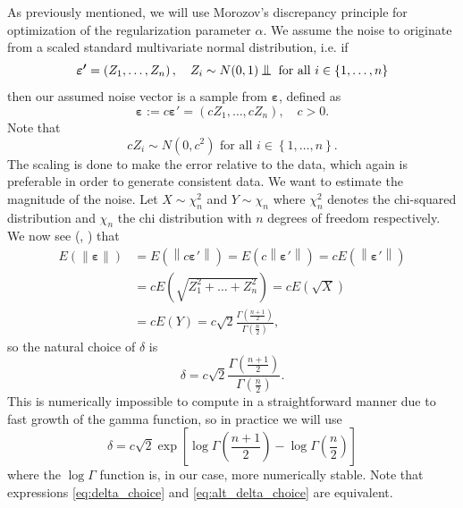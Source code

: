 \documentclass[12pt,a4]{article}
\newcommand{\lnorm}{\left\|}
\newcommand{\rnorm}{\right\|}
\newcommand{\eps}{\ensuremath{\varepsilon}}
\newcommand{\vc}[1]{\ensuremath{\bm{#1}}}
\newcommand*{\bigCI}{%
  \mathrel{\text{%
    {\rotatebox[origin=c]{90}{\resizebox{2.25ex}{1.65ex}{$\vDash$}}}%
  }}%
}
\begin{document}
As previously mentioned, we will use Morozov's discrepancy principle for optimization of the regularization parameter $\alpha$. We assume the noise to originate from a scaled standard multivariate normal distribution, i.e. if
\begin{equation}
\vc{\eps'} = \left(Z_1, \ldots, Z_n \right), \quad Z_i \sim N(0,1) \bigCI \text{ for all }
i \in \left\{1, \ldots, n\right\}
\end{equation}
then our assumed noise vector is a sample from $\vc{\eps}$, defined as
\begin{equation}
\vc{\eps} := c \vc{\eps'} = \left(cZ_1, \ldots, cZ_n \right), \quad c > 0.
\end{equation}
Note that
\begin{equation}
cZ_i \sim N\left(0,c^2\right) \text{ for all }
i \in \left\{1, \ldots, n\right\}.
\end{equation}
The scaling is done to make the error relative to the data, which again is preferable in order to generate consistent data. We want to estimate the magnitude of the noise. Let $X \sim \chi_n^2$ and $Y \sim \chi_n$ where $\chi_n^2$ denotes the chi-squared distribution and $\chi_n$ the chi distribution with $n$ degrees of freedom respectively. We now see (\cite{handbook}, \cite{chi}) that
\begin{align*}
E\left(\lnorm \vc{\eps} \rnorm \right)   &= E\left(\lnorm c \vc{\eps'} \rnorm \right)   =
E\left(c \lnorm \vc{\eps'} \rnorm \right) = c E\left(\lnorm \vc{\eps'} \rnorm \right) \\
&= c E\left(\sqrt{Z_1^2 + \ldots + Z_n^2} \right) = c E\left(\sqrt{X} \right) \\
&= c E\left( Y \right) = 
c \sqrt{2}\frac{\Gamma\left(\frac{n+1}{2}\right)}{\Gamma\left(\frac{n}{2}\right)},  
\end{align*}
so the natural choice of $\delta$ is
\begin{equation}\label{eq:delta_choice}
\delta = c \sqrt{2}\frac{\Gamma\left(\frac{n+1}{2}\right)}{\Gamma\left(\frac{n}{2}\right)}.
\end{equation}
This is numerically impossible to compute in a straightforward manner due to fast growth of the gamma function, so in practice we will use 
\begin{equation}\label{eq:alt_delta_choice}
\delta = c\sqrt{2} \exp\left[
\log\Gamma\left(\frac{n+1}{2}\right) -  \log\Gamma\left(\frac{n}{2}\right) \right]  
\end{equation}
where the $\log\Gamma$ function is, in our case, more numerically stable. Note that expressions \eqref{eq:delta_choice} and \eqref{eq:alt_delta_choice} are equivalent.
\end{document}
